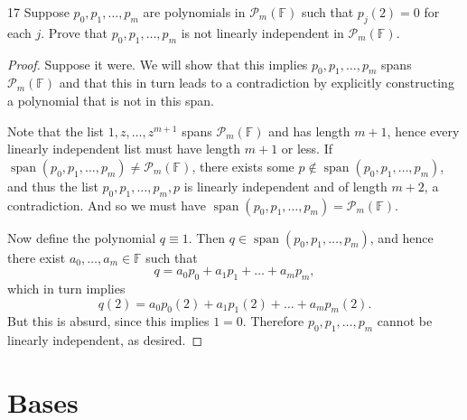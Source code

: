 \documentclass{extarticle}
\newenvironment{problem}[1]{\begin{prob*}{#1}{}}{\end{prob*}}
\newcommand{\F}{\mathbb{F}}
\DeclareMathOperator{\Span}{span}
\begin{document}
\begin{problem}{17}
Suppose $p_0, p_1,\dots, p_m$ are polynomials in $\mathcal{P}_m(\F)$ such that $p_j(2)=0$ for each $j$.  Prove that $p_0,p_1,\dots,p_m$ is not linearly independent in $\mathcal{P}_m(\F)$.
\end{problem}
\begin{proof}
Suppose it were.  We will show that this implies $p_0, p_1,\dots, p_m$ spans $\mathcal{P}_m(\F)$ and that this in turn leads to a contradiction by explicitly constructing a polynomial that is not in this span.
\par Note that the list $1,z,\dots, z^{m+1}$ spans $\mathcal{P}_m(\F)$ and has length $m+1$, hence every linearly independent list must have length $m+1$ or less.  If $\Span(p_0, p_1,\dots, p_m)\neq \mathcal{P}_m(\F)$, there exists some $p\not\in\Span(p_0,p_1,\dots, p_m)$, and thus the list $p_0,p_1, \dots,p_m, p$ is linearly independent and of length $m+2$, a contradiction.  And so we must have $\Span(p_0,p_1,\dots,p_m) = \mathcal{P}_m(\F)$.
\par Now define the polynomial $q\equiv 1$.  Then $q\in\Span(p_0, p_1,\dots, p_m)$, and hence there exist $a_0,\dots, a_m\in\F$ such that 
\begin{equation*}
q = a_0p_0+a_1p_1 + \dots + a_mp_m,
\end{equation*}
which in turn implies 
\begin{equation*}
q(2) = a_0p_0(2)+a_1p_1(2) + \dots + a_mp_m(2).
\end{equation*}
But this is absurd, since this implies $1 = 0$.  Therefore $p_0,p_1,\dots,p_m$ cannot be linearly independent, as desired.
\end{proof}


\section{Bases}
\end{document}
